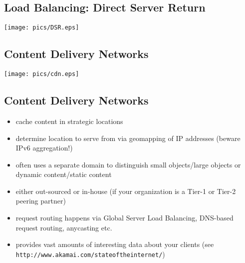 \documentclass[xga]{xdvislides}
\begin{document}
\subsection{Load Balancing: Direct Server Return}
\begin{center}
	\texttt{[image: pics/DSR.eps]}
\end{center}

\subsection{Content Delivery Networks}
\begin{center}
	\texttt{[image: pics/cdn.eps]}
\end{center}

\subsection{Content Delivery Networks}
\begin{itemize}
	\item cache content in strategic locations
	\item determine location to serve from via geomapping of IP
		addresses (beware IPv6 aggregation!)
	\item often uses a separate domain to distinguish small
		objects/large objects or dynamic content/static content
	\item either out-sourced or in-house (if your organization is a
		Tier-1 or Tier-2 peering partner)
	\item request routing happens via Global Server Load Balancing,
		DNS-based request routing, anycasting etc.
	\item provides vast amounts of interesting data about your clients
		(see \verb+http://www.akamai.com/stateoftheinternet/+)
\end{itemize}

\end{document}
